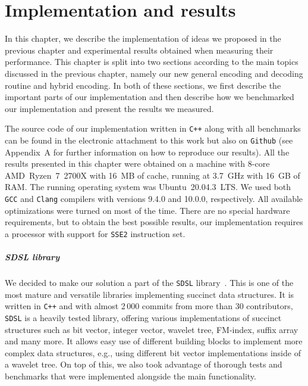 \chapter{Implementation and results}
\label{kap:kap4}

In this chapter, we describe the implementation of ideas we proposed in the previous
chapter and experimental results obtained when measuring their performance.
This chapter is split into two sections according to the main topics discussed
in the previous chapter, namely our new general encoding and decoding routine and hybrid
encoding. In both of these sections, we first describe the important parts of our
implementation and then describe how we benchmarked our implementation and present the
results we measured.

The source code of our implementation written in \texttt{C++} along with all benchmarks can
be found in the electronic attachment to this work but also on \texttt{Github} (see Appendix~A
for further information on how to reproduce our results). All the results presented in this
chapter were obtained on a machine with 8-core AMD~Ryzen~7~2700X with 16~MB of cache, running
at 3.7~GHz with 16~GB of RAM. The running operating system was Ubuntu~20.04.3~LTS. We used both
\texttt{GCC} and \texttt{Clang} compilers with versions 9.4.0 and 10.0.0, respectively. All
available optimizations were turned on most of the time. There are no special hardware requirements,
but to obtain the best possible results, our implementation requires a processor with support for
\texttt{SSE2} instruction set.

\paragraph{SDSL library}

We decided to make our solution a part of the \texttt{SDSL} library~\citep{gog2014theory}. This
is one of the most mature and versatile libraries implementing succinct data structures. It is
written in \texttt{C++} and with almost 2\,000 commits from more than 30 contributors, \texttt{SDSL}
is a heavily tested library, offering various implementations of succinct structures such as
bit vector, integer vector, wavelet tree, FM-index, suffix array and many more. It allows easy use
of different building blocks to implement more complex data structures, e.g., using different bit vector
implementations inside of a wavelet tree. On top of this, we also took advantage of thorough tests
and benchmarks that were implemented alongside the main functionality.

